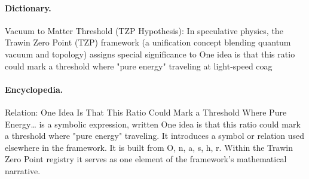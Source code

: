 \paragraph{Dictionary.}
Vacuum to Matter Threshold (TZP Hypothesis): In speculative physics, the Trawin Zero Point (TZP) framework (a unification concept blending quantum vacuum and topology) assigns special significance to One idea is that this ratio could mark a threshold where "pure energy" traveling at light-speed coag

\paragraph{Encyclopedia.}
Relation: One Idea Is That This Ratio Could Mark a Threshold Where Pure Energy… is a symbolic expression, written One idea is that this ratio could mark a threshold where "pure energy" traveling. It introduces a symbol or relation used elsewhere in the framework. It is built from O, n, a, s, h, r. Within the Trawin Zero Point registry it serves as one element of the framework's mathematical narrative.
